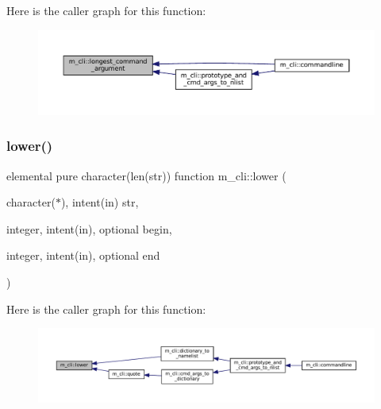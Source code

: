 Here is the caller graph for this function\+:\nopagebreak
\begin{figure}[H]
\begin{center}
\leavevmode
\includegraphics[width=350pt]{namespacem__cli_aaf5504d3b48696a9d22fa5773c5a7d15_icgraph}
\end{center}
\end{figure}
\mbox{\label{namespacem__cli_a685574282a09c3f57e0c18654a3a642c}} 
\subsubsection{\texorpdfstring{lower()}{lower()}}
{\footnotesize\ttfamily elemental pure character(len(str)) function m\+\_\+cli\+::lower (\begin{DoxyParamCaption}\item[{character($\ast$), intent(in)}]{str,  }\item[{integer, intent(in), optional}]{begin,  }\item[{integer, intent(in), optional}]{end }\end{DoxyParamCaption})\hspace{0.3cm}{\ttfamily [private]}}

Here is the caller graph for this function\+:\nopagebreak
\begin{figure}[H]
\begin{center}
\leavevmode
\includegraphics[width=350pt]{namespacem__cli_a685574282a09c3f57e0c18654a3a642c_icgraph}
\end{center}
\end{figure}
\mbox{\label{namespacem__cli_a5b6abaf1d5aec5e918be0759df29c849}} 
